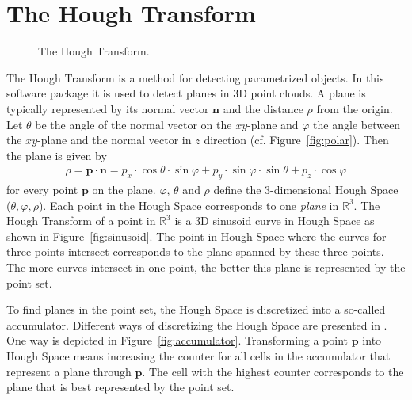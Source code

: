 \documentclass{InsightArticle}
\newcommand{\V}[1]{\mathbf{#1}}
\begin{document}
\section{The Hough Transform}

\begin{figure}[H]
\centering
{}
\caption{The Hough Transform.}
\end{figure}

The Hough Transform \cite{Hough:1962, Duda:1971} is a method for detecting parametrized
objects. In this software package it is used to detect planes in 3D point
clouds. A plane is typically represented by its normal vector $\V{n}$ and the
distance $\rho$
from the origin. Let $\theta$ be the angle of the normal vector on the
$xy$-plane and $\varphi$ the angle between the $xy$-plane and the normal vector
in $z$ direction (cf. Figure~\ref{fig:polar}). Then the plane is given by 
\begin{align*}
\rho = \V{p} \cdot \V{n} = 
{p}_x \cdot \cos{\theta} \cdot \sin{\varphi} + {p}_y \cdot \sin{\varphi} \cdot
\sin{\theta} + {p}_z \cdot \cos{\varphi}
\end{align*}
for every point $\V{p}$ on the plane.
$\varphi$, $\theta$ and $\rho$ define the 3-dimensional Hough Space
($\theta,\varphi,\rho$). Each point in the Hough Space corresponds to one
\emph{plane} in $\mathbb{R}^3$. 
The Hough Transform of a point in $\mathbb{R}^3$
is a 3D sinusoid curve in Hough Space as shown in Figure~\ref{fig:sinusoid}. The point in Hough Space where the
curves for three points intersect corresponds to the plane spanned by these three
points. The more curves intersect in one point, the better this plane is
represented by the point set. 

To find planes in the point set, the Hough
Space is discretized into a so-called accumulator. Different ways of discretizing the Hough Space are
presented in \cite{Borrmann:2011}. One way is depicted in
Figure~\ref{fig:accumulator}.
Transforming a point $\V{p}$ into Hough Space means increasing the counter for all cells in the accumulator
that represent a plane through $\V{p}$. The cell with the highest
counter corresponds to the plane that is best represented by the point set.
\end{document}

